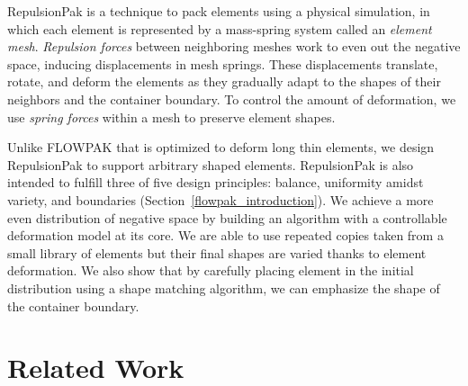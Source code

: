 \newtext
{
RepulsionPak is a technique
to pack elements using a physical simulation, 
in which each element is represented
by a mass-spring system called an \textit{element mesh}.  
\textit{Repulsion forces} between neighboring meshes work to even out the negative
space, inducing displacements in mesh springs.
These displacements translate, rotate, and deform the elements as 
they gradually adapt to the shapes of their neighbors
and the container boundary.  
To control the amount of deformation,
we use \textit{spring forces} within a mesh to preserve element shapes.
}

\newtext
{
Unlike FLOWPAK that is optimized to deform long thin elements, 
we design RepulsionPak to support arbitrary shaped elements.
RepulsionPak is also intended to fulfill three of five design principles:
balance, uniformity amidst variety, and boundaries (Section~\ref{flowpak_introduction}). 
We achieve a more even distribution of negative space by building an algorithm with a controllable deformation model at its core. 
We are able to use repeated copies taken from a small library of elements 
but their final shapes are varied thanks to element deformation.
We also show that by carefully placing element in the initial distribution using a shape matching algorithm, 
we can emphasize the shape of the container boundary.
}





\section{Related Work}
\label{repulsionpak_previous_work}


